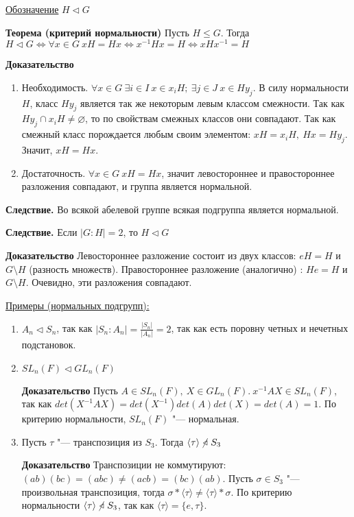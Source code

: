 \documentclass{article}
\begin{document}
\underline{Обозначение} $H \triangleleft G$

\vspace{10pt}

\textbf{Теорема (критерий нормальности)}
Пусть $H \leq G$. Тогда $H \triangleleft G \Leftrightarrow \forall x \in G \  xH = Hx \Leftrightarrow x^{-1}Hx = H \Leftrightarrow xHx^{-1} = H$

\textbf{Доказательство}
\begin{enumerate}
	\item Необходимость. $\forall x \in G \  \exists i \in I \  x \in x_iH; \  \exists j \in J \  x \in Hy_j$. В силу нормальности $H$, класс $Hy_j$ является так же некоторым левым классом смежности. Так как $Hy_j \cap x_iH \neq \varnothing$, то по свойствам смежных классов они совпадают. Так как смежный класс порождается любым своим элементом: $xH = x_iH, \  Hx = Hy_j$. Значит, $xH = Hx$.
	\item Достаточность. $\forall x \in G \  xH = Hx$, значит левостороннее и правостороннее разложения совпадают, и группа является нормальной.
\end{enumerate}

\vspace{10pt}

\textbf{Следствие.} Во всякой абелевой группе всякая подгруппа является нормальной.

\vspace{10pt}

\textbf{Следствие.} Если $|G:H| = 2$, то $H \triangleleft G$

\textbf{Доказательство}
Левостороннее разложение состоит из двух классов: $eH = H$ и $G \setminus H$ (разность множеств).
Правостороннее разложение (аналогично) : $He = H$ и $G \setminus H$.
Очевидно, эти разложения совпадают.

\vspace{10pt}

\underline{Примеры (нормальных подгрупп):}
\begin{enumerate}
	\item $A_n \triangleleft S_n$, так как $|S_n:A_n| = \frac{|S_n|}{|A_n|} = 2$, так как есть поровну четных и нечетных подстановок.
	\item $SL_n(F) \triangleleft GL_n(F)$
	
	\textbf{Доказательство}
	Пусть $A \in SL_n(F), \  X \in GL_n(F). \  x^{-1}AX \in SL_n(F)$, так как $det(X^{-1}AX) = det(X^{-1})det(A)det(X) = det(A) = 1$. По критерию нормальности, $SL_n(F)$ "--- нормальная.
	\item Пусть $\tau$ "--- транспозиция из $S_3$. Тогда $\langle \tau \rangle \  \cancel\triangleleft \  S_3$
	
	\textbf{Доказательство}
	Транспозиции не коммутируют: $(a b)(b c) = (a b c) \neq (a c b) = (b c)(a b)$. Пусть $\sigma \in S_3$ "--- произвольная транспозиция, тогда $\sigma*\langle \tau \rangle \neq \langle \tau \rangle*\sigma$.  По критерию нормальности $\langle \tau \rangle \ \cancel  \triangleleft \  S_3$, так как $\langle \tau \rangle = \{e, \tau \}$.
\end{enumerate}
\end{document}
